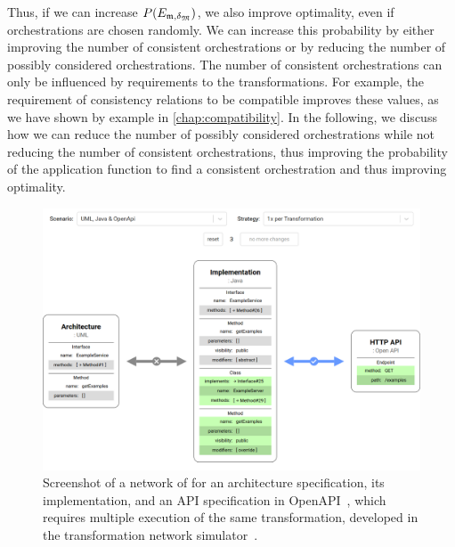 Thus, if we can increase $P(E_{\modeltuple{m},\changetuple{\metamodeltuple{M}}})$, we also improve optimality, even if orchestrations are chosen randomly.
We can increase this probability by either improving the number of consistent orchestrations or by reducing the number of possibly considered orchestrations.
The number of consistent orchestrations can only be influenced by requirements to the transformations.
For example, the requirement of consistency relations to be compatible improves these values, as we have shown by example in \autoref{chap:compatibility}.
In the following, we discuss how we can reduce the number of possibly considered orchestrations while not reducing the number of consistent orchestrations, thus improving the probability of the application function to find a consistent orchestration and thus improving optimality.

\begin{figure}
    \centering
    \includegraphics[width=\textwidth]{figures/correctness/orchestration/simulator_screenshot.png}
    \caption[Screenshot of the transformation network simulator]{Screenshot of a network of for an architecture specification, its implementation, and an \gls{API} specification in OpenAPI~\cite{OpenAPI}, which requires multiple execution of the same transformation, developed in the transformation network simulator~\cite{gleitze2020OrchestrationSimulator}.}
    \label{fig:orchestration:simulator}
\end{figure}

